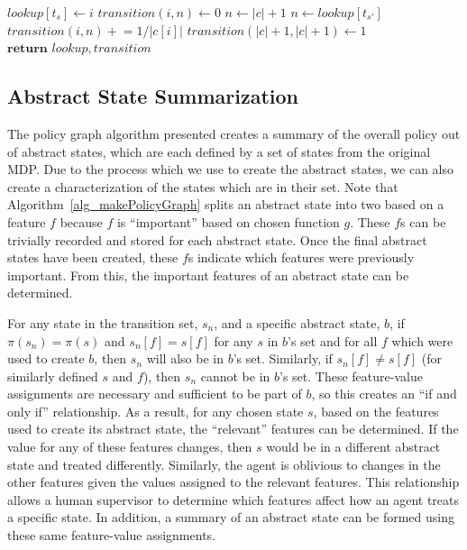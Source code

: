 \documentclass[letterpaper]{article} %
\newcommand{\pluseq}{\mathrel{+}=}
\begin{document}
\begin{algorithm}[t]
\caption{Create mapping function and transition matrix based on policy graph.} \label{alg_computeTransitions}
\begin{algorithmic}[1]
\State $lookup[t_s] \leftarrow i$ 
\EndFor
{} 
\State $transition(i, n) \leftarrow 0$
\EndFor
\EndFor
{}
 
\State $n \leftarrow |c| + 1$
\Else {}
\State $n \leftarrow lookup[t_{s'}]$
\EndIf
\State $transition(i, n) \pluseq 1 / |c[i]|$
\EndFor
\EndFor
\State $transition(|c|+1, |c|+1) \leftarrow 1$ 
\State $\textbf{return } lookup, transition$
\EndProcedure
\end{algorithmic}
\end{algorithm}

\subsection{Abstract State Summarization} \label{approach_abstractStateSummarization}
The policy graph algorithm presented creates a summary of the overall policy out of abstract states, which are each defined by a set of states from the original MDP. Due to the process which we use to create the abstract states, we can also create a characterization of the states which are in their set. Note that Algorithm~\ref{alg_makePolicyGraph} splits an abstract state into two based on a feature $f$ because $f$ is ``important'' based on chosen function $g$. These $f$s can be trivially recorded and stored for each abstract state. Once the final abstract states have been created, these $f$s indicate which features were previously important. From this, the important features of an abstract state can be determined.

For any state in the transition set, $s_n$, and a specific abstract state, $b$, if $\pi(s_n) = \pi(s)$ and $s_n[f] = s[f]$ for any $s$ in $b$'s set and for all $f$ which were used to create $b$, then $s_n$ will also be in $b$'s set. Similarly, if $s_n[f] \neq s[f]$ (for similarly defined $s$ and $f$), then $s_n$ cannot be in $b$'s set. These feature-value assignments are necessary and sufficient to be part of $b$, so this creates an ``if and only if'' relationship. As a result, for any chosen state $s$, based on the features used to create its abstract state, the ``relevant'' features can be determined.
If the value for any of these features changes, then $s$ would be in a different abstract state and treated differently. Similarly, the agent is oblivious to changes in the other features given the values assigned to the relevant features. This relationship allows a human supervisor to determine which features affect how an agent treats a specific state. In addition, a summary of an abstract state can be formed using these same feature-value assignments.
\end{document}
